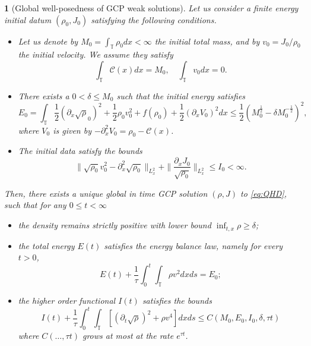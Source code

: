 \documentclass[leqno]{amsart}
\theoremstyle{plain}
\newtheorem{thm}{\protect\theoremname}
\theoremstyle{definition}
\theoremstyle{remark}
\theoremstyle{plain}
\theoremstyle{plain}
\providecommand{\theoremname}{Theorem}
\def\T{{\mathbb T}}%
\def\d{{\partial}}
\numberwithin{equation}{section}
\begin{document}
\begin{thm}[Global well-posedness of GCP weak solutions]\label{thm:glob2}
Let us consider a finite energy initial datum $(\rho_0, J_0)$ satisfying the following conditions.
\begin{itemize}
\item Let us denote by $M_0=\int_\T\rho_0dx<\infty$ the initial total mass, and by $v_0=J_0/\rho_0$ the initial velocity. We assume they satisfy 
\begin{equation}\label{eq:cond_1}
\int_\T \mathcal{C}(x)dx=M_0,\quad \int_\T v_0 dx=0.
\end{equation}

\item There exists a $0<\delta\leq M_0$ such that the initial energy satisfies
\begin{equation}\label{eq:ini_en_intro}
E_0=\int_\T \frac12(\d_x\sqrt\rho_0)^2+\frac12\rho_0 v_0^2+f(\rho_0)+\frac12(\d_x V_0)^2dx\leq \frac12\left(M_0^\frac12-\delta M_0^{-\frac12}\right)^2,
\end{equation}
where $V_0$ is given by $-\d_x^2 V_0=\rho_0-\mathcal{C}(x)$.
\item The initial data satisfy the bounds
\begin{equation}\label{eq:C2_intro}
\|\sqrt{\rho_0}v_0^2-\d_x^2\sqrt{\rho_0}\|_{L^2_x}
+\|\frac{\d_xJ_0}{\sqrt{\rho_0}}\|_{L^2_x}\leq I_0<\infty.
\end{equation}
\end{itemize}
Then, there exists a unique global in time GCP solution $(\rho,J)$ to \eqref{eq:QHD}, such that for any $0\leq t<\infty$
\begin{itemize}
\item the density remains strictly positive with lower bound $\inf_{t,x}\rho\geq \delta$;
\item the total energy $E(t)$ satisfies the energy balance law, namely for every $t>0$,  
\begin{equation}\label{eq:en_disp_intro}
E(t)+\frac{1}{\tau}\int_0^t\int_\T \rho v^2 dxds=E_0;
\end{equation}
\item the higher order functional $I(t)$ satisfies the bounds
\begin{equation}\label{eq:bd_I}
I(t)+\frac{1}{\tau}\int_0^t\int_\T [(\d_t\sqrt\rho)^2+\rho v^4 ]dxds\leq C(M_0,E_0,I_0,\delta,\tau t)
\end{equation}
where $C(\dots,\tau t)$ grows at most at the rate $e^{\tau t}$.
\end{itemize}
\end{thm}
\end{document}
